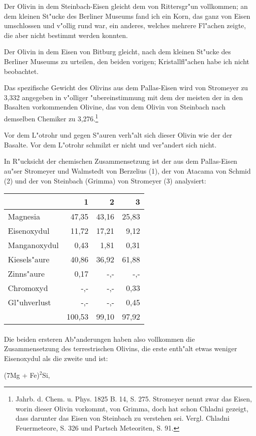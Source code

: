 \documentclass[a4paper, 11pt, oneside]{article}
\begin{document}
Der Olivin in dem Steinbach-Eisen gleicht dem von Rittersgr"un vollkommen; an dem kleinen St"ucke des Berliner Museums fand ich ein Korn, das ganz von Eisen umschlossen und v"ollig rund war, ein anderes, welches mehrere Fl"achen zeigte, die aber nicht bestimmt werden konnten.

Der Olivin in dem Eisen von Bitburg gleicht, nach dem kleinen St"ucke des Berliner Museums zu urteilen, den beiden vorigen; Kristallfl"achen habe ich nicht beobachtet.

Das spezifische Gewicht des Olivins aus dem Pallas-Eisen wird von Stromeyer zu 3,332 angegeben in v"olliger "ubereinstimmung mit dem der meisten der in den Basalten vorkommenden Olivine, das von dem Olivin von Steinbach nach demselben Chemiker zu 3,276.\footnote{Jahrb. d. Chem. u. Phys. 1825 B. 14, S. 275. Stromeyer nennt zwar das Eisen, worin dieser Olivin vorkommt, von Grimma, doch hat schon Chladni gezeigt, dass darunter das Eisen von Steinbach zu verstehen sei. Vergl. Chladni Feuermeteore, S. 326 und Partsch Meteoriten, S. 91.}

Vor dem L"otrohr und gegen S"auren verh"alt sich dieser Olivin wie der der Basalte. Vor dem L"otrohr schmilzt er nicht und ver"andert sich nicht.

In R"ucksicht der chemischen Zusammensetzung ist der aus dem Pallas-Eisen au"ser Stromeyer und Walmstedt von Berzelius (1), der von Atacama von Schmid (2) und der von Steinbach (Grimma) von Stromeyer (3) analysiert:
\begin{center}
\begin{tabular}{ |l|r|r|r| }
    \hline
     & 1 & 2 & 3\\
    \hline\hline
    Magnesia & 47,35 & 43,16 & 25,83\\\hline
    Eisenoxydul & 11,72 & 17,21 & 9,12\\\hline
    Manganoxydul & 0,43 & 1,81 & 0,31\\\hline
    Kiesels"aure & 40,86 & 36,92 & 61,88\\\hline
    Zinns"aure & 0,17 & -,- & -,-\\\hline
    Chromoxyd & -,- & -,- & 0,33\\\hline
    Gl"uhverlust & -,- & -,- & 0,45\\\hline
     &100,53 & 99,10 & 97,92\\
    \hline
\end{tabular}
\end{center}
\paragraph{}
Die beiden ersteren Ab"anderungen haben also vollkommen die Zusammensetzung des terrestrischen Olivins, die erste enth"alt etwas weniger Eisenoxydul als die zweite und ist:
\begin{center}
(7Mg + Fe)$^{2}$Si,
\end{center}
\end{document}

